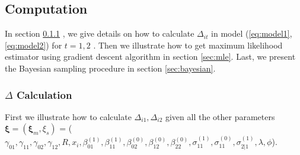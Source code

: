 \documentclass[12pt]{article}
\begin{document}
\subsection{Computation}
\label{sec:computation}
In section \ref{sec:deltacal} , we give details on how to calculate
$\Delta_{it}$ in model (\ref{eq:model1}, \ref{eq:model2}) for $t = 1,
2$ . Then we illustrate how to get maximum likelihood estimator using
gradient descent algorithm in section \ref{sec:mle}. Last, we present
the Bayesian sampling procedure in section \ref{sec:bayesian}.

\subsubsection{$\Delta$ Calculation}
\label{sec:deltacal}

First we illustrate how to calculate $\Delta_{i1}, \Delta_{i2}$ given
all the other parameters $\bm \xi = (\bm \xi_m, \xi_s)$ =
($\gamma_{01}, \gamma_{11}, \gamma_{02}, \gamma_{12}, R, x_i,
\beta_{01}^{(1)}, \beta_{11}^{(1)}, \beta_{02}^{(0)},
\beta_{12}^{(0)}, \beta_{22}^{(0)}, \sigma_{11}^{(1)},
\sigma_{11}^{(0)}, \sigma_{2|1}^{(1)}, \lambda, \phi$).
\end{document}
